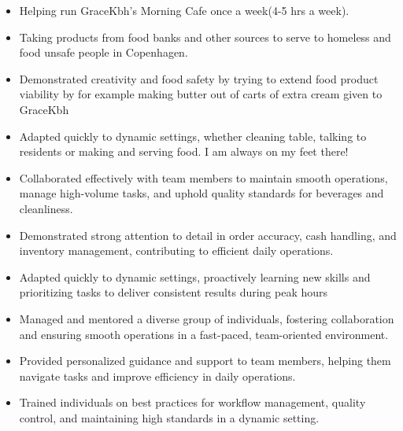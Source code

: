 \documentclass[10pt,a4paper,ragged2e,withhyper]{altacv}
\begin{document}
\begin{paracol}{2}


\begin{itemize}
    \item Helping run GraceKbh's Morning Cafe once a week(4-5 hrs a week).
    \item Taking products from food banks and other sources to serve to homeless and food unsafe people in Copenhagen.
    \item Demonstrated creativity and food safety by trying to extend food product viability by for example making butter out of carts of extra cream given to GraceKbh
    \item Adapted quickly to dynamic settings, whether cleaning table, talking to residents or making and serving food. I am always on my feet there!
\end{itemize}
\begin{itemize}
    \item Collaborated effectively with team members to maintain smooth operations, manage high-volume tasks, and uphold quality standards for beverages and cleanliness.
    \item Demonstrated strong attention to detail in order accuracy, cash handling, and inventory management, contributing to efficient daily operations.
    \item Adapted quickly to dynamic settings, proactively learning new skills and prioritizing tasks to deliver consistent results during peak hours
\end{itemize}
\begin{itemize}
    \item Managed and mentored a diverse group of individuals, fostering collaboration and ensuring smooth operations in a fast-paced, team-oriented environment.

    \item Provided personalized guidance and support to team members, helping them navigate tasks and improve efficiency in daily operations.

    \item Trained individuals on best practices for workflow management, quality control, and maintaining high standards in a dynamic setting.


\end{itemize}
\end{paracol}
\end{document}
